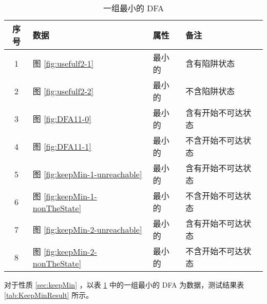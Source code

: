 \begin{table}[!htbp]
    \caption{一组最小的 DFA}
    \label{tab:KeepMinData}
    \centering
    \small%
    \setlength{\tabcolsep}{4pt}%
    \renewcommand{\arraystretch}{1.2}%
    \begin{tabular}{c p{4em}<{\centering} p{4em}<{\centering} l}  %
        \toprule %
                序号  &  数据 & 属性 & 备注 \\
        \midrule%
        1 &  图 \ref{fig:usefulf2-1} & 最小的 & 含有陷阱状态 \\
        2 &  图 \ref{fig:usefulf2-2} & 最小的 & 不含陷阱状态 \\
        \midrule
        3 & 图 \ref{fig:DFA11-0} & 最小的 & 含有开始不可达状态 \\
        4 & 图 \ref{fig:DFA11-1} & 最小的 & 不含开始不可达状态 \\
       \midrule
        5 & 图 \ref{fig:keepMin-1-unreachable} & 最小的 & 含有开始不可达状态 \\
        6 & 图 \ref{fig:keepMin-1-nonTheState} & 最小的 & 不含开始不可达状态 \\
       \midrule
        7 & 图 \ref{fig:keepMin-2-unreachable} & 最小的 & 含有开始不可达状态 \\
        8 & 图 \ref{fig:keepMin-2-nonTheState} & 最小的 & 不含开始不可达状态 \\
        \bottomrule%
    \end{tabular}
\end{table}


对于性质 \ref{sec:keepMin} ，以表 \ref{tab:KeepMinData} 中的一组最小的 DFA 为数据，测试结果表 \ref{tab:KeepMinResult} 所示。




